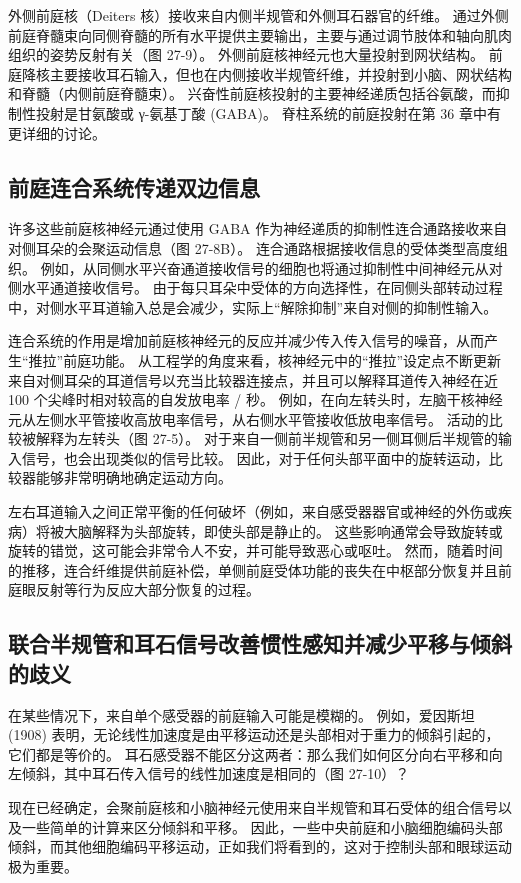 外侧前庭核（Deiters 核）接收来自内侧半规管和外侧耳石器官的纤维。 通过外侧前庭脊髓束向同侧脊髓的所有水平提供主要输出，主要与通过调节肢体和轴向肌肉组织的姿势反射有关（图 27-9）。 外侧前庭核神经元也大量投射到网状结构。 前庭降核主要接收耳石输入，但也在内侧接收半规管纤维，并投射到小脑、网状结构和脊髓（内侧前庭脊髓束）。 兴奋性前庭核投射的主要神经递质包括谷氨酸，而抑制性投射是甘氨酸或 γ-氨基丁酸 (GABA)。 脊柱系统的前庭投射在第 36 章中有更详细的讨论。

\subsection{前庭连合系统传递双边信息}
许多这些前庭核神经元通过使用 GABA 作为神经递质的抑制性连合通路接收来自对侧耳朵的会聚运动信息（图 27-8B）。 连合通路根据接收信息的受体类型高度组织。 例如，从同侧水平兴奋通道接收信号的细胞也将通过抑制性中间神经元从对侧水平通道接收信号。 由于每只耳朵中受体的方向选择性，在同侧头部转动过程中，对侧水平耳道输入总是会减少，实际上“解除抑制”来自对侧的抑制性输入。

连合系统的作用是增加前庭核神经元的反应并减少传入传入信号的噪音，从而产生“推拉”前庭功能。 从工程学的角度来看，核神经元中的“推拉”设定点不断更新来自对侧耳朵的耳道信号以充当比较器连接点，并且可以解释耳道传入神经在近 100 个尖峰时相对较高的自发放电率 / 秒。 例如，在向左转头时，左脑干核神经元从左侧水平管接收高放电率信号，从右侧水平管接收低放电率信号。 活动的比较被解释为左转头（图 27-5）。 对于来自一侧前半规管和另一侧耳侧后半规管的输入信号，也会出现类似的信号比较。 因此，对于任何头部平面中的旋转运动，比较器能够非常明确地确定运动方向。

左右耳道输入之间正常平衡的任何破坏（例如，来自感受器器官或神经的外伤或疾病）将被大脑解释为头部旋转，即使头部是静止的。 这些影响通常会导致旋转或旋转的错觉，这可能会非常令人不安，并可能导致恶心或呕吐。 然而，随着时间的推移，连合纤维提供前庭补偿，单侧前庭受体功能的丧失在中枢部分恢复并且前庭眼反射等行为反应大部分恢复的过程。


\subsection{联合半规管和耳石信号改善惯性感知并减少平移与倾斜的歧义}
在某些情况下，来自单个感受器的前庭输入可能是模糊的。 例如，爱因斯坦 (1908) 表明，无论线性加速度是由平移运动还是头部相对于重力的倾斜引起的，它们都是等价的。 耳石感受器不能区分这两者：那么我们如何区分向右平移和向左倾斜，其中耳石传入信号的线性加速度是相同的（图 27-10）？

现在已经确定，会聚前庭核和小脑神经元使用来自半规管和耳石受体的组合信号以及一些简单的计算来区分倾斜和平移。 因此，一些中央前庭和小脑细胞编码头部倾斜，而其他细胞编码平移运动，正如我们将看到的，这对于控制头部和眼球运动极为重要。


